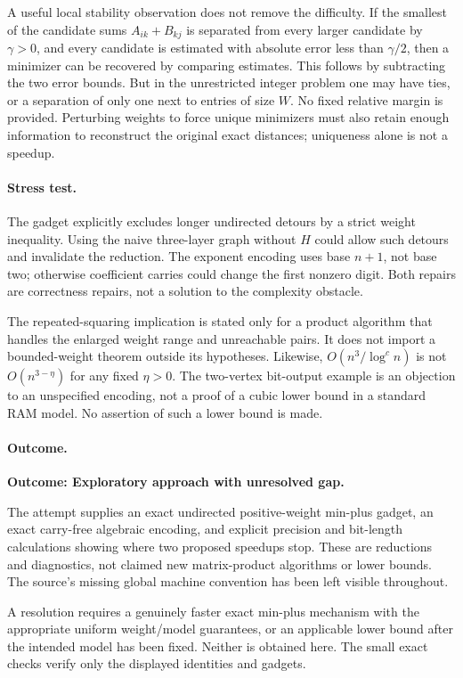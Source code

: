 \documentclass[11pt,a4paper]{article}
\numberwithin{equation}{section}
\begin{document}
A useful local stability observation does not remove the difficulty.
If the smallest of the candidate sums $A_{ik}+B_{kj}$ is separated
from every larger candidate by $\gamma>0$, and every candidate is
estimated with absolute error less than $\gamma/2$, then a minimizer
can be recovered by comparing estimates. This follows by subtracting
the two error bounds. But in the unrestricted integer problem one
may have ties, or a separation of only one next to entries of size
$W$. No fixed relative margin is provided. Perturbing weights to force
unique minimizers must also retain enough information to reconstruct
the original exact distances; uniqueness alone is not a speedup.

\paragraph{Stress test.}
The gadget explicitly excludes longer undirected detours by a strict
weight inequality. Using the naive three-layer graph without $H$ could
allow such detours and invalidate the reduction. The exponent encoding
uses base $n+1$, not base two; otherwise coefficient carries could change
the first nonzero digit. Both repairs are correctness repairs, not a
solution to the complexity obstacle.

The repeated-squaring implication is stated only for a product algorithm
that handles the enlarged weight range and unreachable pairs. It does
not import a bounded-weight theorem outside its hypotheses. Likewise,
$O(n^3/\log^c n)$ is not $O(n^{3-\eta})$ for any fixed $\eta>0$.
The two-vertex bit-output example is an objection to an unspecified
encoding, not a proof of a cubic lower bound in a standard RAM model.
No assertion of such a lower bound is made.

\paragraph{Outcome.}
\textbf{Outcome: Exploratory approach with unresolved gap.}

The attempt supplies an exact undirected positive-weight min-plus gadget,
an exact carry-free algebraic encoding, and explicit precision and
bit-length calculations showing where two proposed speedups stop.
These are reductions and diagnostics, not claimed new matrix-product
algorithms or lower bounds. The source's missing global machine convention
has been left visible throughout.

A resolution requires a genuinely faster exact min-plus mechanism with
the appropriate uniform weight/model guarantees, or an applicable lower
bound after the intended model has been fixed. Neither is obtained here.
The small exact checks verify only the displayed identities and gadgets.
\end{document}
